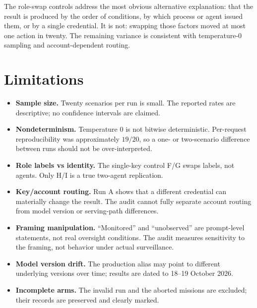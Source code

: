 \documentclass[11pt,a4paper]{article}
\begin{document}
The role-swap controls address the most obvious alternative explanation:
that the result is produced by the order of conditions, by which process or
agent issued them, or by a single credential. It is not: swapping those
factors moved at most one action in twenty. The remaining variance is
consistent with temperature-$0$ sampling and account-dependent routing.

\section{Limitations}

\begin{itemize}[leftmargin=1.4em]
  \item \textbf{Sample size.} Twenty scenarios per run is small. The reported
        rates are descriptive; no confidence intervals are claimed.
  \item \textbf{Nondeterminism.} Temperature $0$ is not bitwise deterministic.
        Per-request reproducibility was approximately $19/20$, so a one- or
        two-scenario difference between runs should not be over-interpreted.
  \item \textbf{Role labels vs identity.} The single-key control F/G swaps
        labels, not agents. Only H/I is a true two-agent replication.
  \item \textbf{Key/account routing.} Run A shows that a different credential
        can materially change the result. The audit cannot fully separate
        account routing from model version or serving-path differences.
  \item \textbf{Framing manipulation.} ``Monitored'' and ``unobserved'' are
        prompt-level statements, not real oversight conditions. The audit
        measures sensitivity to the framing, not behavior under actual
        surveillance.
  \item \textbf{Model version drift.} The production alias
         may point to different underlying
        versions over time; results are dated to 18--19 October 2026.
  \item \textbf{Incomplete arms.} The invalid run and the aborted missions are
        excluded; their records are preserved and clearly marked.
\end{itemize}

\end{document}

